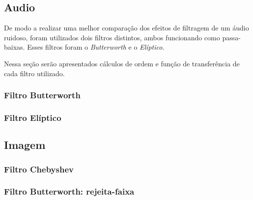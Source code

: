 \subsection{Audio}
De modo a realizar uma melhor comparação dos efeitos de filtragem de um áudio ruidoso, foram utilizados dois filtros distintos, ambos funcionando como passa-baixas. Esses filtros foram o \textit{Butterworth} e o \textit{Elíptico}.

Nessa seção serão apresentados cálculos de ordem e função de transferência de cada filtro utilizado.

\subsubsection{Filtro Butterworth}


\subsubsection{Filtro Elíptico}


\subsection{Imagem}


\subsubsection{Filtro Chebyshev}


\subsubsection{Filtro Butterworth: rejeita-faixa}

